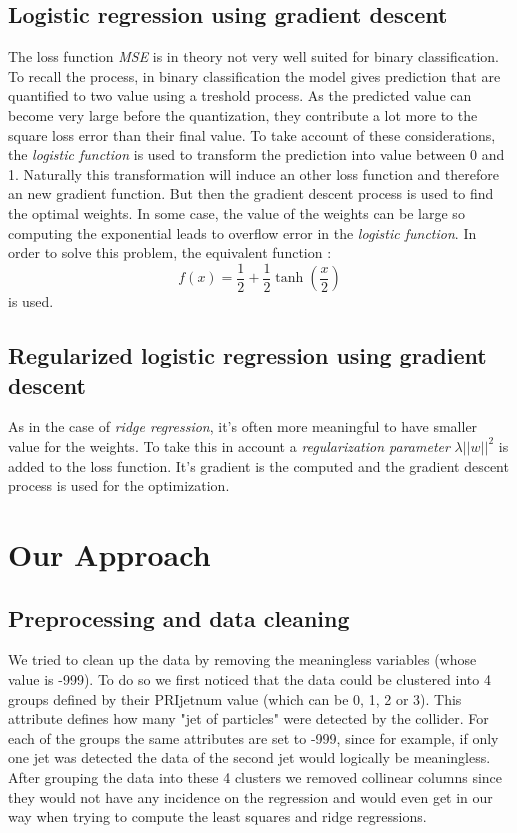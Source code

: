 \documentclass[10pt,conference,compsocconf]{IEEEtran}
\begin{document}
\subsection{Logistic regression using gradient descent}
The loss function \textit{MSE} is in theory not very well suited for binary classification. To recall the process, in binary classification the model gives prediction that are quantified to two value using a treshold process. As the predicted value can become very large before the quantization, they contribute a lot more to the square loss error than their final value. To take account of these considerations, the \textit{logistic function} is used to transform the prediction into value between 0 and 1. Naturally this transformation will induce an other loss function and therefore an new gradient function. But then the gradient descent process is used to find the optimal weights. In some case, the value of the weights can be large so computing the exponential leads to overflow error in the \textit{logistic function}. In order to solve this problem, the equivalent function : 
\begin{equation}
f(x) = \frac{1}{2}+\frac{1}{2}\tanh \left(\frac{x}{2}\right)
\end{equation} 
is used.
\subsection{Regularized logistic regression using gradient descent}

As in the case of \textit{ridge regression}, it's often more meaningful to have smaller value for the weights. To take this in account a \textit{regularization parameter} $\lambda \vert\vert w \vert\vert ^2$ is added to the loss function. It's gradient is the computed and the gradient descent process is used for the optimization.


\section{Our Approach}

\subsection{Preprocessing and data cleaning}
We tried to clean up the data by removing the meaningless variables (whose value is -999). To do so we first noticed that the data could be clustered into 4 groups defined by their PRIjetnum value (which can be 0, 1, 2 or 3). This attribute defines how many "jet of particles" were detected by the collider. For each of the groups the same attributes are set to -999, since for example, if only one jet was detected the data of the second jet would logically be meaningless. After grouping the data into these 4 clusters we removed collinear columns since they would not have any incidence on the regression and would even get in our way when trying to compute the least squares and ridge regressions.
\end{document}
